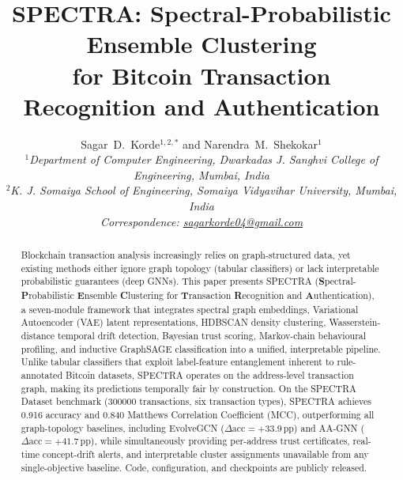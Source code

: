 \documentclass[journal]{IEEEtran}
\newcommand{\spectra}{\textsc{SPECTRA}}
\begin{document}
\title{\spectra: Spectral-Probabilistic Ensemble Clustering\\
       for Bitcoin Transaction Recognition and Authentication}

\author{%
  Sagar~D.~Korde$^{1,2,*}$ and Narendra~M.~Shekokar$^{1}$\\[6pt]
  \normalsize\itshape
  $^{1}$Department of Computer Engineering, Dwarkadas J. Sanghvi College of
  Engineering, Mumbai, India\\
  $^{2}$K. J. Somaiya School of Engineering, Somaiya Vidyavihar University,
  Mumbai, India\\
  \upshape *Correspondence: \href{mailto:sagarkorde04@gmail.com}{sagarkorde04@gmail.com}%
}

\maketitle

\begin{abstract}
Blockchain transaction analysis increasingly relies on graph-structured data,
yet existing methods either ignore graph topology (tabular classifiers) or
lack interpretable probabilistic guarantees (deep GNNs).
This paper presents \spectra{}
(\textbf{S}pectral-\textbf{P}robabilistic \textbf{E}nsemble \textbf{C}lustering
for \textbf{T}ransaction \textbf{R}ecognition and \textbf{A}uthentication),
a seven-module framework that integrates spectral graph embeddings,
Variational Autoencoder (VAE) latent representations, HDBSCAN density
clustering, Wasserstein-distance temporal drift detection, Bayesian trust
scoring, Markov-chain behavioural profiling, and inductive GraphSAGE
classification into a unified, interpretable pipeline.
Unlike tabular classifiers that exploit label-feature entanglement inherent
to rule-annotated Bitcoin datasets, \spectra{} operates on the address-level
transaction graph, making its predictions temporally fair by construction.
On the SPECTRA Dataset benchmark (\num{300000} transactions, six transaction
types), \spectra{} achieves \num{0.916} accuracy and \num{0.840} Matthews
Correlation Coefficient (MCC), outperforming all graph-topology baselines,
including EvolveGCN ($\Delta\text{acc}={+33.9}$\,pp) and AA-GNN
($\Delta\text{acc}={+41.7}$\,pp), while simultaneously providing
per-address trust certificates, real-time concept-drift alerts, and
interpretable cluster assignments unavailable from any single-objective
baseline.
Code, configuration, and checkpoints are publicly released.
\end{abstract}
\end{document}
